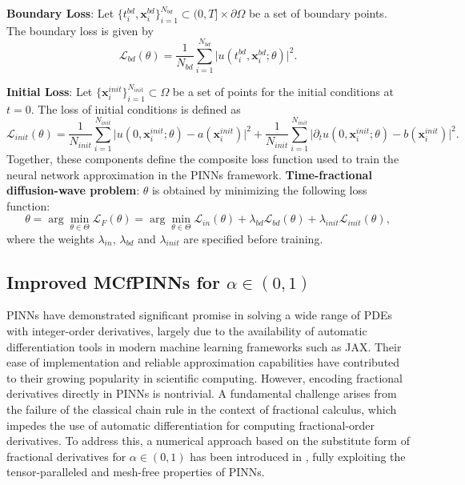 \documentclass[preprint,3p,times]{elsarticle}
\def\al{\alpha}
\def\x{\mathbf{x}}
\def\L{\mathcal{L}}
\def\al{\alpha}
\begin{document}
\textbf{Boundary Loss}: Let $\{t_i^{bd}, \x_{i}^{bd}\}_{i=1}^{N_{bd}} \subset (0,T]\times\partial\Omega$ be a set of boundary points. The boundary loss is given by 
\begin{equation}
    \label{loss:bdry}
    \L_{bd}(\theta) = \frac{1}{N_{bd}}\sum_{i=1}^{N_{bd}}\Bigg| u(t_i^{bd},\x_i^{bd};\theta)\Bigg|^2.
\end{equation}

\textbf{Initial Loss}: Let $\{\x_i^{init}\}_{i=1}^{N_{init}} \subset \Omega$ be a set of points for the initial conditions at $t=0$. The loss of initial conditions is defined as
\begin{equation}
    \label{loss:init}
    \L_{init}(\theta) = \frac{1}{N_{init}}\sum_{i=1}^{N_{init}}\Bigg|u(0,\x_i^{init};\theta)-a(\x_i^{init})\Bigg|^2+\frac{1}{N_{init}}\sum_{i=1}^{N_{init}}\Bigg|\partial_tu(0,\x_i^{init};\theta)-b(\x_i^{init})\Bigg|^2.
\end{equation}
Together, these components define the composite loss function used to train the neural network approximation in the PINNs framework.
\textbf{Time-fractional diffusion-wave problem}: $\theta$ is obtained by minimizing the following loss function:
    \begin{equation}
    \label{eqn:loss-forward}
    \theta =\arg\min_{\theta\in\Theta}\L_F(\theta)=\arg\min_{\theta\in\Theta}\L_{in}(\theta)+\lambda_{bd}\L_{bd}(\theta)+\lambda_{init}\L_{init}(\theta),
    \end{equation}
    where the weights $\lambda_{in}$, $\lambda_{bd}$ and $\lambda_{init}$ are specified before training.

\subsection{Improved MCfPINNs for $\al\in(0,1)$}
\label{subsec:IMCPINN}
PINNs have demonstrated significant promise in solving a wide range of PDEs with integer-order derivatives, largely due to the availability of automatic differentiation tools in modern machine learning frameworks such as JAX. Their ease of implementation and reliable approximation capabilities have contributed to their growing popularity in scientific computing. However, encoding fractional derivatives directly in PINNs is nontrivial. A fundamental challenge arises from the failure of the classical chain rule in the context of fractional calculus, which impedes the use of automatic differentiation for computing fractional-order derivatives. To address this, a numerical approach based on the substitute form of fractional derivatives for $\alpha\in(0,1)$ has been introduced in \cite{Guo2022:MCfPINN, Hu2024:CMAME}, fully exploiting the tensor-paralleled and mesh-free properties of PINNs.
\end{document}
